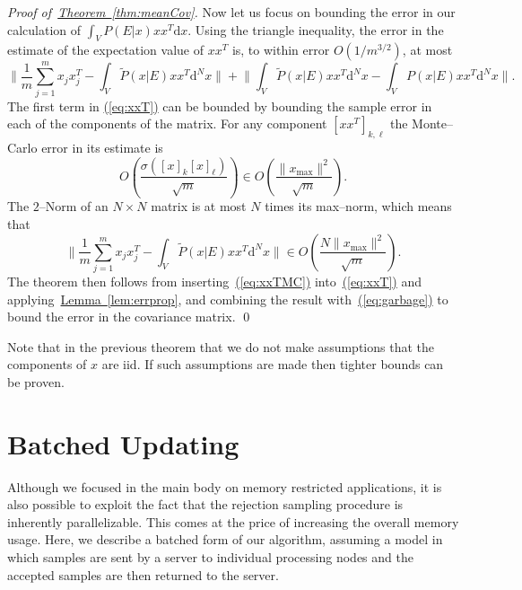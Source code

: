 \documentclass[twoside]{article}
\newenvironment{proofof}[1]{\begin{trivlist}\item[]{\flushleft\it
Proof of~#1.}}
{\qed\end{trivlist}}
\newcommand{\eq}[1]{\hyperref[eq:#1]{(\ref*{eq:#1})}}
\newcommand{\thm}[1]{\hyperref[thm:#1]{Theorem~\ref*{thm:#1}}}
\newcommand{\lem}[1]{\hyperref[lem:#1]{Lemma~\ref*{lem:#1}}}
\begin{document}
\begin{proofof}{\thm{meanCov}}
Now let us focus on bounding the error in our calculation of $\int_V P(E|x) xx^T \mathrm{d}x$. Using the triangle inequality, the error in the estimate of the expectation value of $x x^T$ is, to within error $O(1/m^{3/2})$, at most
\begin{equation}
\Biggr\|\frac{1}{m} \sum_{j=1}^m x_j x_j^T - \int_V \tilde{P}(x|E) x x^T\mathrm{d}^Nx\Biggr\|+\Biggr\| \int_V \tilde{P}(x|E) x x^T\mathrm{d}^Nx-\int_V {P}(x|E) x x^T\mathrm{d}^Nx\Biggr\|.\label{eq:xxT}
\end{equation}
The first term in \eq{xxT} can be bounded by bounding the sample error in each of the components of the matrix.  For any component $[xx^T]_{k,\ell}$ the Monte--Carlo error in its estimate is
\begin{equation}
O\left(\frac{\sigma({[x]_k[x]_\ell})}{\sqrt{m}}\right)\in O\left(\frac{\|x_{\max}\|^2}{\sqrt{m}}\right).
\end{equation}
The $2$--Norm of an $N\times N$ matrix is at most $N$ times its max--norm, which means that
\begin{equation}
\Biggr\|\frac{1}{m} \sum_{j=1}^m x_j x_j^T - \int_V \tilde{P}(x|E) x x^T\mathrm{d}^Nx\Biggr\|\in O\left(\frac{N\|x_{\max}\|^2}{\sqrt{m}}\right).\label{eq:xxTMC}
\end{equation}
The theorem then follows from inserting~\eq{xxTMC} into~\eq{xxT} and applying~\lem{errprop}, and combining the result with~\eq{garbage} to bound the error in the covariance matrix.
\end{proofof}

Note that in the previous theorem that we do not make assumptions that the components of $x$ are iid.  If such assumptions are made then tighter bounds can be proven.

\section{Batched Updating}
\label{app:batched-updates}

Although we focused in the main body on memory restricted applications, it is also possible to exploit the fact that the
rejection sampling procedure is inherently parallelizable.
This comes at the price of increasing the overall
memory usage. Here, we describe a batched form of our algorithm, assuming a model in which samples are sent by a server to individual processing nodes and the accepted samples are then returned to the server.
\end{document}
